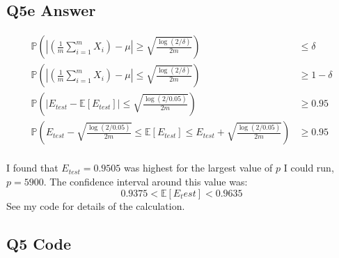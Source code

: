\documentclass{article}
\newcommand{\1}{\mathbf{1}}
\renewcommand{\P}{\mathbb{P}} %
\def\E{\mathbb{E}}
\def\P{\mathbb{P}}
\begin{document}
\subsection{Q5e Answer}

\begin{align*}
\P\left( \left| \left(\frac{1}{m} \sum_{i=1}^m X_i\right) - \mu \right| \geq \sqrt{\frac{\log(2/\delta)}{2m}} \right) & \leq \delta \\
\P\left( \left| \left(\frac{1}{m} \sum_{i=1}^m X_i\right) - \mu \right| \leq \sqrt{\frac{\log(2/\delta)}{2m}} \right) & \geq 1 - \delta \\
\P\left( \left| E_{test} - \E[E_{test}] \right| \leq \sqrt{\frac{\log(2/0.05)}{2m}} \right) & \geq 0.95 \\
\P\left( E_{test} - \sqrt{\frac{\log(2/0.05)}{2m}} \leq  \E[E_{test}]  \leq E_{test} + \sqrt{\frac{\log(2/0.05)}{2m}} \right) & \geq 0.95 \\
\end{align*}

I found that $E_{test}=0.9505$ was highest for the largest value of $p$ I could run, $p=5900$. 
The confidence interval around this value was:
$$ 0.9375 < \E[E_test] < 0.9635	$$
See my code for details of the calculation. 

\subsection{Q5 Code}

\end{document}
